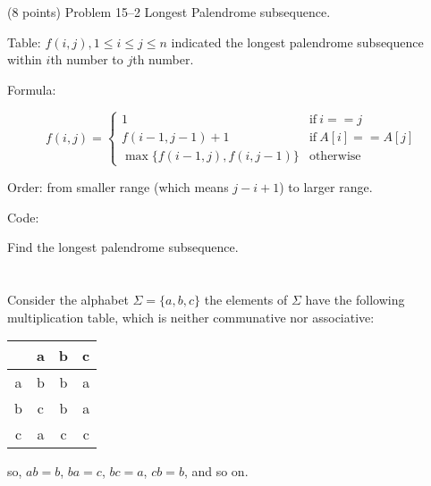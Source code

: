 \documentclass[paper=a4, fontsize=11pt]{scrartcl} %
\begin{document}
\begin{fancyquotes}
  (8 points) Problem 15--2 Longest Palendrome subsequence.
\end{fancyquotes}

Table: $f(i,j), 1\leq i\leq j\leq n$ indicated the longest palendrome
subsequence within $i$th number to $j$th number.

Formula:

\begin{equation*}
  f(i,j)=
  \begin{cases}
    1 & \text{if}\ i==j\\
    f(i-1,j-1)+1 & \text{if}\ A[i]==A[j]\\
    \max\{f(i-1,j), f(i,j-1)\} & \text{otherwise}
  \end{cases}
\end{equation*}

Order: from smaller range (which means $j-i+1$) to larger range.

Code:

\begin{algorithm}[H]
  \caption{Find the longest palendrome subsequence.}
\end{algorithm}

\pagebreak

\section{}

\begin{fancyquotes}
  Consider the alphabet $\Sigma = \{a,b,c\}$ the elements of $\Sigma$
  have the following multiplication table, which is neither
  communative nor associative:

  \begin{tabular}[c]{|c|c|c|c|}
    \hline
    & a & b & c \\
    \hline
    a & b & b & a \\
    \hline
    b & c & b & a \\
    \hline
    c & a & c & c \\
    \hline
  \end{tabular}

  so, $ab = b$, $ba = c$, $bc = a$, $cb = b$, and so on.
\end{fancyquotes}
\end{document}
